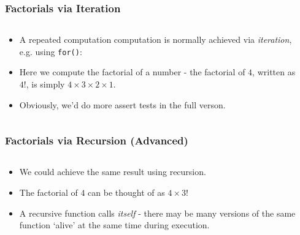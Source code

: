 
\begin{frame}[fragile]
\frametitle{Factorials via Iteration}
\begin{columns}

\begin{column}{0.55\textwidth}
\begin{itemize}[<+->]
\item A repeated computation computation is normally
achieved via {\it iteration}, e.g. using \verb^for()^:
\item Here we compute the factorial of a number - the factorial of
$4$, written as $4!$, is simply $4\times3\times2\times1$.
\item Obviously, we'd do more assert tests in the full verson.
\end{itemize}
\end{column}

\begin{column}{0.40\textwidth}

\end{column}

\end{columns}
\end{frame}


\begin{frame}[fragile]
\frametitle{Factorials via Recursion (Advanced)}
\begin{columns}

\begin{column}{0.60\textwidth}
\begin{itemize}[<+->]
\item We could achieve the same result using recursion.
\item The factorial of $4$ can be thought of as $4\times3!$
\item A recursive function calls {\it itself} - there may be many versions of the same function `alive' at the same time during execution.
\end{itemize}
\end{column}

\begin{column}{0.35\textwidth}

\end{column}

\end{columns}
\end{frame}

